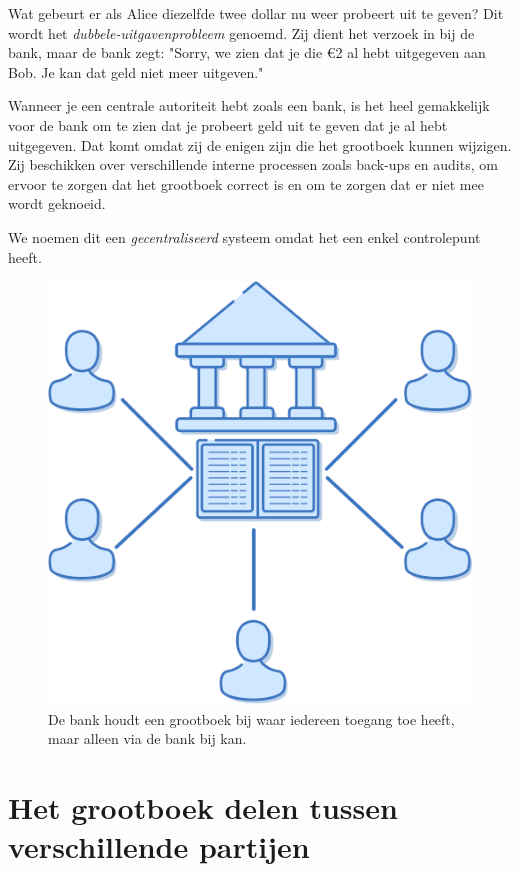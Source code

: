 \documentclass[
  letterpaper,
]{scrbook}
\begin{document}
Wat gebeurt er als Alice diezelfde twee dollar nu weer probeert uit te
geven? Dit wordt het \emph{dubbele-uitgavenprobleem} genoemd. Zij dient
het verzoek in bij de bank, maar de bank zegt: "Sorry, we zien dat je
die €2 al hebt uitgegeven aan Bob. Je kan dat geld niet meer uitgeven."

Wanneer je een centrale autoriteit hebt zoals een bank, is het heel
gemakkelijk voor de bank om te zien dat je probeert geld uit te geven
dat je al hebt uitgegeven. Dat komt omdat zij de enigen zijn die het
grootboek kunnen wijzigen. Zij beschikken over verschillende interne
processen zoals back-ups en audits, om ervoor te zorgen dat het
grootboek correct is en om te zorgen dat er niet mee wordt geknoeid.

We noemen dit een \emph{gecentraliseerd} systeem omdat het een enkel
controlepunt heeft.

\begin{figure}

{\centering \includegraphics{./images/fig2.png}

}

\caption{De bank houdt een grootboek bij waar iedereen toegang toe
heeft, maar alleen via de bank bij kan.}

\end{figure}

\hypertarget{het-grootboek-delen-tussen-verschillende-partijen}{%
\section{Het grootboek delen tussen verschillende
partijen}\label{het-grootboek-delen-tussen-verschillende-partijen}}
\end{document}
